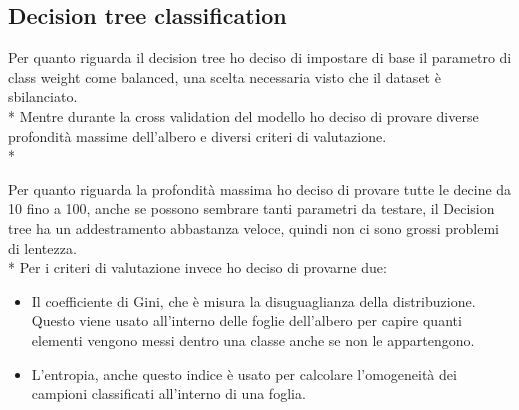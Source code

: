\subsection{Decision tree classification}\label{tree}
\normalsize
Per quanto riguarda il decision tree ho deciso di impostare di base il parametro di class weight come balanced, una scelta necessaria visto che il dataset è sbilanciato.\\*
Mentre durante la cross validation del modello ho deciso di provare diverse profondità massime dell’albero e  diversi criteri di valutazione. \\*

Per quanto riguarda la profondità massima ho deciso di provare tutte le decine da 10 fino a 100, anche se possono sembrare tanti parametri da testare, il Decision tree ha un addestramento abbastanza veloce, quindi non ci sono grossi problemi di lentezza.\\*
Per i criteri di valutazione invece ho deciso di provarne due:

\begin{itemize}
	\item Il coefficiente di Gini, che è misura la disuguaglianza della distribuzione. Questo viene usato all'interno delle foglie dell'albero per capire quanti elementi vengono messi dentro una classe anche se non le appartengono.
	\item L'entropia, anche questo indice è usato per calcolare l'omogeneità dei campioni classificati all’interno di una foglia.

\end{itemize}

